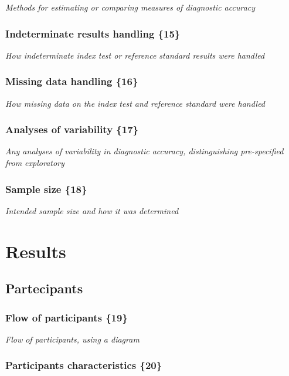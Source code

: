 {\em Methods for estimating or comparing measures of diagnostic accuracy}

\subsubsection{Indeterminate results handling \{15\}}

{\em How indeterminate index test or reference standard results were handled}

\subsubsection{Missing data handling \{16\}}

{\em How missing data on the index test and reference standard were handled}

\subsubsection{Analyses of variability \{17\}}

{\em Any analyses of variability in diagnostic accuracy,
  distinguishing pre-specified from exploratory}

\subsubsection{Sample size \{18\}}

{\em Intended sample size and how it was determined}


\section{Results}


\subsection{Partecipants}

\subsubsection{Flow of participants \{19\}}

{\em Flow of participants, using a diagram}

\subsubsection{Participants characteristics \{20\}}

